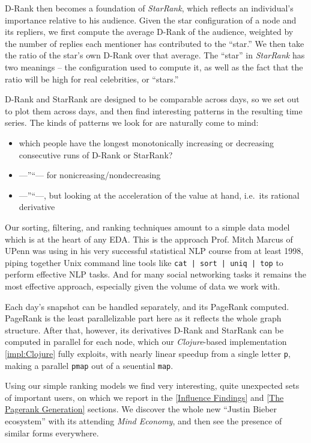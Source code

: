 \documentclass[10pt,oneside]{memoir}
\begin{document}
D-Rank then becomes a foundation of {\itshape StarRank}, which reflects an individual's importance relative to his audience.  Given the star configuration of a node and its repliers, we first compute the average D-Rank of the audience, weighted by the number of replies each mentioner has contributed to the ``star.''  We then take the ratio of the star's own D-Rank over that average.  The ``star'' in {\itshape StarRank} has two meanings -- the configuration used to compute it, as well as the fact that the ratio will be high for real celebrities, or ``stars.''  


D-Rank and StarRank are designed to be comparable across days, so we set out to plot them across days, and then find interesting patterns in the resulting time series.  The kinds of patterns we look for are naturally come to mind:


\begin{itemize}


\item which people have the longest monotonically increasing or decreasing consecutive runs of D-Rank or StarRank?

\item ---''``--- for nonicreasing/nondecreasing

\item ---''``---, but looking at the acceleration of the value at hand, i.e.\ its rational derivative
\end{itemize}

Our sorting, filtering, and ranking techniques amount to a simple data model which is at the heart of any EDA.  This is the approach Prof. Mitch Marcus of UPenn was using in his very successful statistical NLP course from at least 1998, piping together Unix command line tools like \texttt{cat | sort | uniq | top} to perform effective NLP tasks.  And for many social networking tasks it remains the most effective approach, especially given the volume of data we work with.  


Each day's snapshot can be handled separately, and its PageRank computed.  PageRank is the least parallelizable part here as it reflects the whole graph structure.  After that, however, its derivatives D-Rank and StarRank can be computed in parallel for each node, which our {\itshape Clojure}-based implementation \ref{impl:Clojure} fully exploits, with nearly linear speedup from a single letter \texttt{p}, making a parallel \texttt{pmap} out of a seuential \texttt{map}.


Using our simple ranking models we find very interesting, quite unexpected sets of important users, on which we report in the \ref{Influence Findings} and \ref{The Pagerank Generation} sections.  We discover the whole new ``Justin Bieber ecosystem'' with its attending {\itshape Mind Economy}, and then see the presence of similar forms everywhere.
\end{document}
